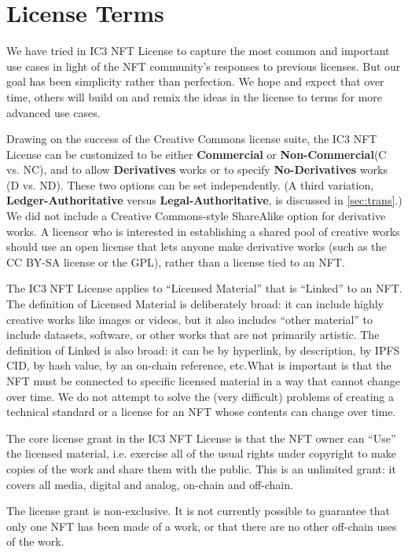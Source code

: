 \documentclass{article}
\newcommand{\iccclicense}{IC3 NFT License\xspace}
\newcommand{\keyword}[1]{\textbf{#1}\xspace}
\newcommand{\commercial}{\keyword{Commercial}}
\newcommand{\noncommercial}{\keyword{Non-Commercial}}
\newcommand{\derivative}{\keyword{Derivatives}}
\newcommand{\noderivative}{\keyword{No-Derivatives}}
\newcommand{\ledger}{\keyword{Ledger-Authoritative}}
\newcommand{\legal}{\keyword{Legal-Authoritative}}
\begin{document}
\section{License Terms}

We have tried in \iccclicense to capture the most common and important use cases in light of the NFT community's responses to previous licenses. But our goal has been simplicity rather than perfection. We hope and expect that over time, others will build on and remix the ideas in the license to terms for more advanced use cases.

Drawing on the success of the Creative Commons license suite, the \iccclicense can be customized to be either \commercial or \noncommercial (C vs. NC), and to allow \derivative works or to specify \noderivative works (D vs. ND). These two options can be set independently. (A third variation, \ledger versus \legal, is discussed in \ref{sec:trans}.) We did not include a Creative Commons-style ShareAlike option for derivative works. A licensor who is interested in establishing a shared pool of creative works should use an open license that lets anyone make derivative works (such as the CC BY-SA license or the GPL), rather than a license tied to an NFT.

The \iccclicense applies to ``Licensed Material'' that is ``Linked'' to an NFT. The definition of Licensed Material is deliberately broad: it can include highly creative works like images or videos, but it also includes ``other material'' to include datasets, software, or other works that are not primarily artistic. The definition of Linked is also broad: it can be by hyperlink, by description, by IPFS CID, by hash value, by an on-chain reference, etc.What is important is that the NFT must be connected to specific licensed material in a way that cannot change over time. We do not attempt to solve the (very difficult) problems of creating a technical standard or a license for an NFT whose contents can change over time.

The core license grant in the \iccclicense is that the NFT owner can ``Use'' the licensed material, i.e. exercise all of the usual rights under copyright to make copies of the work and share them with the public. This is an unlimited grant: it covers all media, digital and analog, on-chain and off-chain. 

The license grant is non-exclusive. It is not currently possible to guarantee that only one NFT has been made of a work, or that there are no other off-chain uses of the work.
\end{document}
